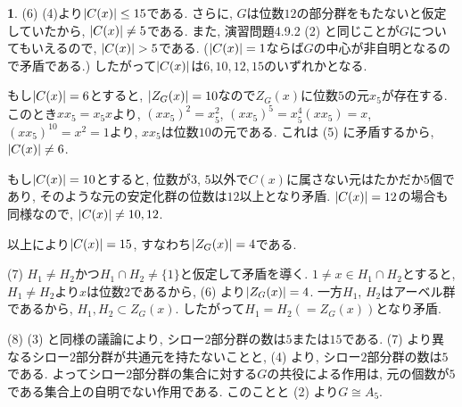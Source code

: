 \documentclass{article}
\theoremstyle{definition}
\newtheorem{ans}{}
\numberwithin{ans}{subsection}
\DeclarePairedDelimiter{\order}{\lvert}{\rvert}
\begin{document}
\begin{ans}
  (6) (4)より$\order{C(x)} \le 15$である.
  さらに, $G$は位数$12$の部分群をもたないと仮定していたから, $\order{C(x)} \neq 5$である.
  また, 演習問題4.9.2 (2) と同じことが$G$についてもいえるので, $\order{C(x)} > 5$である.
  ($\order{C(x)} = 1$ならば$G$の中心が非自明となるので矛盾である.)
  したがって$\order{C(x)}$は$6, 10, 12, 15$のいずれかとなる.

  もし$\order{C(x)} = 6$とすると, $\order{Z_G(x)} = 10$なので$Z_G(x)$に位数$5$の元$x_5$が存在する.
  このとき$xx_5 = x_5x$より, $(xx_5)^2 = x_5^2$, $(xx_5)^5 = x_5^4(xx_5) = x$, $(xx_5)^{10} = x^2 = 1$より,
  $xx_5$は位数$10$の元である. これは (5) に矛盾するから, $\order{C(x)} \neq 6$.

  もし$\order{C(x)} = 10$とすると, 位数が$3$, $5$以外で$C(x)$に属さない元はたかだか$5$個であり,
  そのような元の安定化群の位数は$12$以上となり矛盾. $\order{C(x)} = 12$の場合も同様なので, $\order{C(x)} \neq 10, 12$.

  以上により$\order{C(x)} = 15$, すなわち$\order{Z_G(x)} = 4$である.

  (7) $H_1 \neq H_2$かつ$H_1 \cap H_2 \neq \{ 1 \}$と仮定して矛盾を導く. $1 \neq x \in H_1 \cap H_2$とすると,
  $H_1 \neq H_2$より$x$は位数$2$であるから, (6) より$\order{Z_G(x)} = 4$.
  一方$H_1$, $H_2$はアーベル群であるから, $H_1, H_2 \subset Z_G(x)$.
  したがって$H_1 = H_2 (= Z_G(x))$となり矛盾.

  (8) (3) と同様の議論により, シロー$2$部分群の数は$5$または$15$である.
  (7) より異なるシロー$2$部分群が共通元を持たないことと, (4) より, シロー$2$部分群の数は$5$である.
  よってシロー$2$部分群の集合に対する$G$の共役による作用は,
  元の個数が$5$である集合上の自明でない作用である.
  このことと (2) より$G \cong A_5$.
\end{ans}
\end{document}
